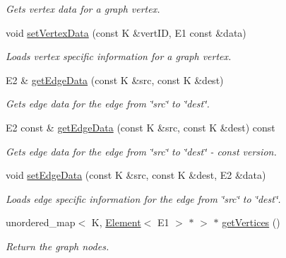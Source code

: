 \begin{DoxyCompactItemize}
\begin{DoxyCompactList}\small\item\em Gets vertex data for a graph vertex. \end{DoxyCompactList}\item 
void \hyperlink{classbridges_1_1datastructure_1_1_graph_adj_list_ab87a30e6cbaf1d2db95dce705ebdd20f}{set\+Vertex\+Data} (const K \&vert\+ID, E1 const \&data)
\begin{DoxyCompactList}\small\item\em Loads vertex specific information for a graph vertex. \end{DoxyCompactList}\item 
E2 \& \hyperlink{classbridges_1_1datastructure_1_1_graph_adj_list_ab56ec428deb9a5bc4499f42bbd710b1a}{get\+Edge\+Data} (const K \&src, const K \&dest)
\begin{DoxyCompactList}\small\item\em Gets edge data for the edge from \char`\"{}src\char`\"{} to \char`\"{}dest\char`\"{}. \end{DoxyCompactList}\item 
E2 const  \& \hyperlink{classbridges_1_1datastructure_1_1_graph_adj_list_a5c2cdffda7c983c3141ae36acc2b698d}{get\+Edge\+Data} (const K \&src, const K \&dest) const
\begin{DoxyCompactList}\small\item\em Gets edge data for the edge from \char`\"{}src\char`\"{} to \char`\"{}dest\char`\"{} -\/ const version. \end{DoxyCompactList}\item 
void \hyperlink{classbridges_1_1datastructure_1_1_graph_adj_list_a21a7e957d60e18b540dc778b1d569372}{set\+Edge\+Data} (const K \&src, const K \&dest, E2 \&data)
\begin{DoxyCompactList}\small\item\em Loads edge specific information for the edge from \char`\"{}src\char`\"{} to \char`\"{}dest\char`\"{}. \end{DoxyCompactList}\item 
unordered\+\_\+map$<$ K, \hyperlink{classbridges_1_1datastructure_1_1_element}{Element}$<$ E1 $>$ $\ast$ $>$ $\ast$ \hyperlink{classbridges_1_1datastructure_1_1_graph_adj_list_af91334de325f4be241c3c939ea9c5a36}{get\+Vertices} ()
\begin{DoxyCompactList}\small\item\em Return the graph nodes. \end{DoxyCompactList}\item 

\end{DoxyCompactItemize}
